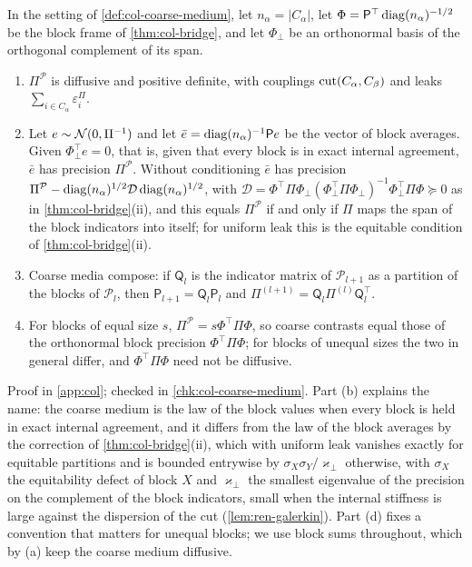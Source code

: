 \begin{lemma}\label{lem:col-coarse-medium}
In the setting of \cref{def:col-coarse-medium}, let $n_\alpha=|C_\alpha|$, let $\Phi=\mathsf P^\top\operatorname{diag}(n_\alpha)^{-1/2}$ be the block frame of \cref{thm:col-bridge}, and let $\Phi_\perp$ be an orthonormal basis of the orthogonal complement of its span.
\begin{enumerate}
\item[(a)] $\Pi^{\mathcal P}$ is diffusive and positive definite, with couplings $\operatorname{cut}(C_\alpha,C_\beta)$ and leaks $\sum_{i\in C_\alpha}\varepsilon^\Pi_i$.
\item[(b)] Let $e\sim\mathcal{N}(0,\Pi^{-1})$ and let $\bar e=\operatorname{diag}(n_\alpha)^{-1}\mathsf Pe$ be the vector of block averages. Given $\Phi_\perp^\top e=0$, that is, given that every block is in exact internal agreement, $\bar e$ has precision $\Pi^{\mathcal P}$. Without conditioning $\bar e$ has precision $\Pi^{\mathcal P}-\operatorname{diag}(n_\alpha)^{1/2}\mathcal D\operatorname{diag}(n_\alpha)^{1/2}$, with $\mathcal D=\Phi^\top\Pi\Phi_\perp(\Phi_\perp^\top\Pi\Phi_\perp)^{-1}\Phi_\perp^\top\Pi\Phi\succeq0$ as in \cref{thm:col-bridge}(ii), and this equals $\Pi^{\mathcal P}$ if and only if $\Pi$ maps the span of the block indicators into itself; for uniform leak this is the equitable condition of \cref{thm:col-bridge}(ii).
\item[(c)] Coarse media compose: if $\mathsf Q_l$ is the indicator matrix of $\mathcal P_{l+1}$ as a partition of the blocks of $\mathcal P_l$, then $\mathsf P_{l+1}=\mathsf Q_l\mathsf P_l$ and $\Pi^{(l+1)}=\mathsf Q_l\Pi^{(l)}\mathsf Q_l^\top$.
\item[(d)] For blocks of equal size $s$, $\Pi^{\mathcal P}=s\Phi^\top\Pi\Phi$, so coarse contrasts equal those of the orthonormal block precision $\Phi^\top\Pi\Phi$; for blocks of unequal sizes the two in general differ, and $\Phi^\top\Pi\Phi$ need not be diffusive.
\end{enumerate}
\end{lemma}
Proof in \cref{app:col}; checked in \cref{chk:col-coarse-medium}. Part (b) explains the name: the coarse medium is the law of the block values when every block is held in exact internal agreement, and it differs from the law of the block averages by the correction of \cref{thm:col-bridge}(ii), which with uniform leak vanishes exactly for equitable partitions and is bounded entrywise by $\sigma_X\sigma_Y/\varkappa_\perp$ otherwise, with $\sigma_X$ the equitability defect of block $X$ and $\varkappa_\perp$ the smallest eigenvalue of the precision on the complement of the block indicators, small when the internal stiffness is large against the dispersion of the cut (\cref{lem:ren-galerkin}). Part (d) fixes a convention that matters for unequal blocks; we use block sums throughout, which by (a) keep the coarse medium diffusive.

